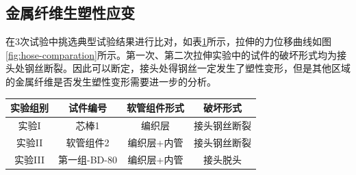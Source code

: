 \subsection{金属纤维生塑性应变}




在3次试验中挑选典型试验结果进行比对，如表\ref{tab:hose-comparation}所示，拉伸的力位移曲线如图\ref{fig:hose-comparation}所示。第一次、第二次拉伸实验中的试件的破坏形式均为接头处钢丝断裂。因此可以断定，接头处得钢丝一定发生了塑性变形，但是其他区域的金属纤维是否发生塑性变形需要进一步的分析。



\begin{table}[!htb]
	\centering
	\label{tab:hose-comparation}
	\begin{tabular}{@{\extracolsep{\fill}}>{\hspace{0.5cm}}cccc}
		\toprule
		实验组别 & 试件编号& 软管组件形式& 破坏形式\\\midrule
		实验I& 芯棒1& 编织层& 接头钢丝断裂\\
		实验II& 软管组件2& 编织层+内管& 接头钢丝断裂\\
		实验III& 第一组-BD-80& 编织层+内管& 接头脱头\\\bottomrule
	\end{tabular} 
\end{table}  


